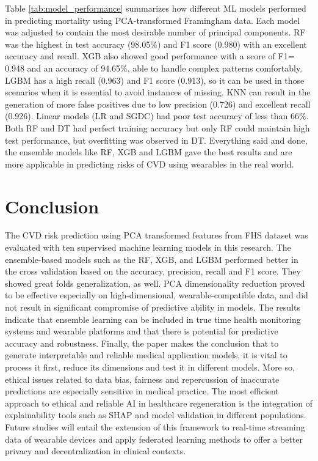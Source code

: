 \documentclass[conference]{IEEEtran}
\begin{document}
Table \ref{tab:model_performance} summarizes how different ML models performed in predicting mortality using PCA-transformed Framingham data. Each model was adjusted to contain the most desirable number of principal components. RF was the highest in test accuracy (98.05\%) and F1 score (0.980) with an excellent accuracy and recall. XGB also showed good performance with a score of F1= 0.948 and an accuracy of 94.65\%, able to handle complex patterns comfortably. LGBM has a high recall (0.963) and F1 score (0.913), so it can be used in those scenarios when it is essential to avoid instances of missing. KNN can result in the generation of more false positives due to low precision (0.726) and excellent recall (0.926). Linear models (LR and SGDC) had poor test accuracy of less than 66\%.  Both RF and DT had perfect training accuracy but only RF could maintain high test performance, but overfitting was observed in DT.  Everything said and done, the ensemble models like RF, XGB and LGBM gave the best results and are more applicable in predicting risks of CVD using wearables in the real world.

\section{Conclusion}
The CVD risk prediction using PCA transformed features from FHS dataset was evaluated with ten supervised machine learning models in this research. The ensemble-based models such as the RF, XGB, and LGBM performed better in the cross validation based on the accuracy, precision, recall and F1 score. They showed great folds generalization, as well. PCA dimensionality reduction proved to be effective especially on high-dimensional, wearable-compatible data, and did not result in significant compromise of predictive ability in models. The results indicate that ensemble learning can be included in true time health monitoring systems and wearable platforms and that there is potential for predictive accuracy and robustness. Finally, the paper makes the conclusion that to generate interpretable and reliable medical application models, it is vital to process it first, reduce its dimensions and test it in different models. More so, ethical issues related to data bias, fairness and repercussion of inaccurate predictions are especially sensitive in medical practice. The most efficient approach to ethical and reliable AI in healthcare regeneration is the integration of explainability tools such as SHAP and model validation in different populations. Future studies will entail the extension of this framework to real-time streaming data of wearable devices and apply federated learning methods to offer a better privacy and decentralization in clinical contexts.
\end{document}
